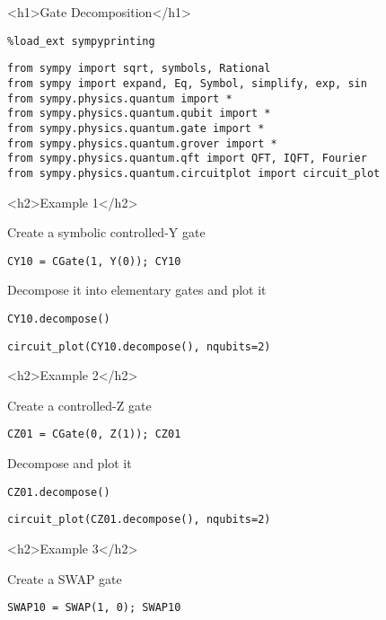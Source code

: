 <h1>Gate Decomposition</h1>

\begin{verbatim}
%load_ext sympyprinting
\end{verbatim}

\begin{verbatim}
from sympy import sqrt, symbols, Rational
from sympy import expand, Eq, Symbol, simplify, exp, sin
from sympy.physics.quantum import *
from sympy.physics.quantum.qubit import *
from sympy.physics.quantum.gate import *
from sympy.physics.quantum.grover import *
from sympy.physics.quantum.qft import QFT, IQFT, Fourier
from sympy.physics.quantum.circuitplot import circuit_plot
\end{verbatim}

<h2>Example 1</h2>

Create a symbolic controlled-Y gate

\begin{verbatim}
CY10 = CGate(1, Y(0)); CY10

\end{verbatim}

Decompose it into elementary gates and plot it

\begin{verbatim}
CY10.decompose()

\end{verbatim}

\begin{verbatim}
circuit_plot(CY10.decompose(), nqubits=2)
\end{verbatim}

<h2>Example 2</h2>

Create a controlled-Z gate

\begin{verbatim}
CZ01 = CGate(0, Z(1)); CZ01

\end{verbatim}

Decompose and plot it

\begin{verbatim}
CZ01.decompose()

\end{verbatim}

\begin{verbatim}
circuit_plot(CZ01.decompose(), nqubits=2)
\end{verbatim}

<h2>Example 3</h2>

Create a SWAP gate

\begin{verbatim}
SWAP10 = SWAP(1, 0); SWAP10

\end{verbatim}

